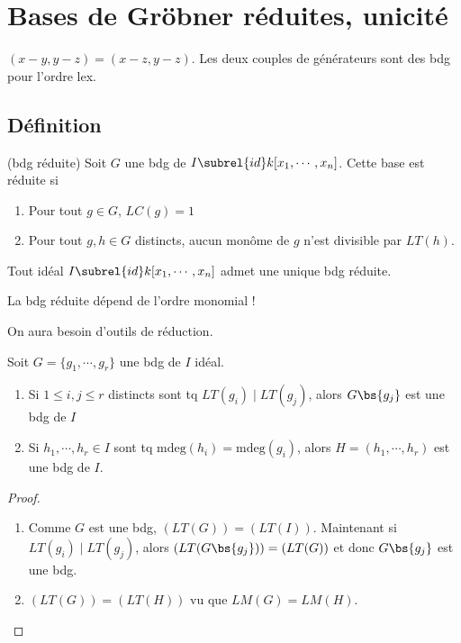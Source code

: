     \section{Bases de Gröbner réduites, unicité}
        \begin{expl}
            $(x-y,y-z) = (x-z, y-z)$. Les deux couples de générateurs sont des bdg pour l'ordre lex.
        \end{expl}
        \subsection{Définition}
            \begin{defi} (bdg réduite)
                Soit $G$ une bdg de $I \subrel{id} k[x_1, \cdots, x_n]$. Cette base est réduite si
                \begin{enumerate}
                    \item Pour tout $g \in G$, $LC(g) = 1$
                    \item Pour tout $g,h \in G$ distincts, aucun monôme de $g$ n'est divisible par $LT(h)$.
                \end{enumerate}
            \end{defi}
            \begin{theo}
                \label{1.5.1}
                Tout idéal $I \subrel{id} k[x_1, \cdots, x_n]$ admet une unique bdg réduite.
            \end{theo}
            \begin{remq}
                La bdg réduite dépend de l'ordre monomial !
            \end{remq}
            On aura besoin d'outils de réduction.
            \begin{lemm}
                Soit $G = \{g_1, \cdots, g_r\}$ une bdg de $I$ idéal.
                \begin{enumerate}
                    \item Si $1 \leq i,j \leq r$ distincts sont tq $LT(g_i) \mid LT(g_j)$, alors $G \bs \{g_j\}$ est une bdg de $I$
                    \item Si $h_1, \cdots, h_r \in I$ sont tq $\mathrm{mdeg}(h_i) = \mathrm{mdeg}(g_i)$, alors $H = (h_1, \cdots, h_r)$ est une bdg de $I$.
                \end{enumerate}
            \end{lemm}
            \begin{proof}
                \begin{enumerate}
                    \item Comme $G$ est une bdg, $(LT(G)) = (LT(I))$. Maintenant si $LT(g_i) \mid LT(g_j)$, alors $(LT(G \bs \{g_j\})) = (LT(G))$ et donc $G \bs \{g_j\}$ est une bdg.
                    \item $(LT(G)) = (LT(H))$ vu que $LM(G) = LM(H)$.
                \end{enumerate}
            \end{proof}
